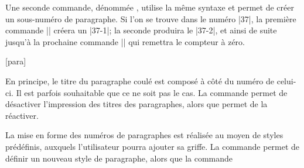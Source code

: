 Une seconde commande, dénommée , utilise la même syntaxe et permet de créer un sous-numéro de paragraphe. Si l'on se trouve dans le \para numéro |37|, la première commande |\subpara| créera un |37-1|; la seconde produira le |37-2|, et ainsi de suite jusqu'à la prochaine commande |\para| qui remettra le compteur  à zéro.

\begin{macro}
\subpara %
\end{macro}

\begin{noprint}
{}
\setcounter{para}{0}
[para]%
\setcounter{subpara}{0}
\end{noprint}

En principe, le titre du paragraphe coulé est composé à côté du numéro de celui-ci. Il est parfois souhaitable que ce ne soit pas le cas. La commande  permet de désactiver l'impression des titres des paragraphes, alors que  permet de la réactiver.

\begin{noprint}
\newcommand{\paranames}{\@paranametrue}
\newcommand{\noparanames}{\@paranamefalse}
\end{noprint}

La mise en forme des numéros de paragraphes est réalisée au moyen de styles prédéfinis, auxquels l'utilisateur pourra ajouter sa griffe. La commande  permet de définir un nouveau style de paragraphe, alors que la commande 

\begin{noprint}
\newcommand{\makeparastyle}[2]{\expandafter\gdef\csname @parastyle@#1\endcsname{#2}}
\newcommand{\parastyle}[1]{\csname @parastyle@#1\endcsname}
\end{noprint}

